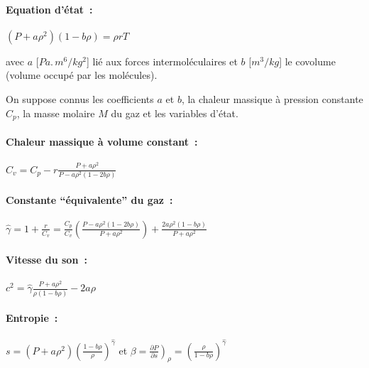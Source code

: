 \paragraph{Equation d'\'etat~:}

$(P+a\rho^2)(1-b\rho) = \rho r T$

avec $a$ [$Pa.\,m^6 / kg^2$] li\'e aux forces intermol\'eculaires
et $b$ [$m^3/kg$] le covolume (volume occup\'e par les mol\'ecules).

On suppose connus les coefficients $a$ et $b$,
la chaleur massique \`a pression constante $C_p$,
la masse molaire $M$ du gaz et
les variables d'\'etat.


\paragraph{Chaleur massique \`a volume constant~:}

$C_v = C_p - r
\displaystyle\frac{P+a\rho^2}{P-a\rho^2 (1-2b\rho)}$


\paragraph{Constante ``\'equivalente'' du gaz~:}

$\hat{\gamma} = 1 + \displaystyle\frac{r}{C_v}
= \displaystyle\frac{C_p}{C_v}
\displaystyle\left(\frac{P-a\rho^2 (1-2b\rho)}{P+a\rho^2}\right)
+ \displaystyle\frac{2a\rho^2 (1-b\rho)}{P+a\rho^2}$

\paragraph{Vitesse du son~:}

$c^2 = \hat{\gamma} \displaystyle\frac{P+a\rho^2}{\rho(1-b\rho)} - 2a\rho$


\paragraph{Entropie~:}

$s = (P+a\rho^2)
\left(\displaystyle\frac{1-b\rho}{\rho}\right)^{\hat{\gamma}}$
\quad et
$\beta = \left.\displaystyle\frac{\partial P}{\partial s}\right)_{\rho}
= \left(\displaystyle\frac{\rho}{1-b\rho}\right)^{\hat{\gamma}}$


